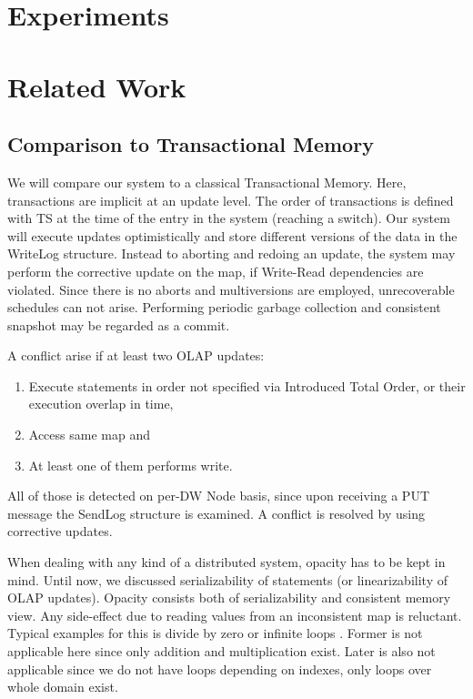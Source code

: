 \documentclass{sig-semester}
\def\OLAP{OLAP\xspace}
\begin{document}
\section{Experiments}
\label{sec:Experiments}
\vspace{2mm}

\section{Related Work}
\label{sec:Related}
\vspace{2mm}

\subsection{Comparison to Transactional Memory}
We will compare our system to a classical Transactional Memory. Here, transactions are implicit at an update level. The order of transactions is defined with TS at the time of the entry in the system (reaching a switch). Our system will execute updates optimistically and store different versions of the data in the WriteLog structure. Instead to aborting and redoing an update, the system may perform the corrective update on the map, if Write-Read dependencies are violated. Since there is no aborts and multiversions are employed, unrecoverable schedules can not arise. Performing periodic garbage collection and consistent snapshot may be regarded as a commit.

A conflict arise if at least two \OLAP updates:
\begin{enumerate}[(1)]
 \item Execute statements in order not specified via Introduced Total Order, or their execution overlap in time, 
 \item Access same map and
 \item At least one of them performs write.
\end{enumerate}

All of those is detected on per-DW Node basis, since upon receiving a PUT message the SendLog structure is examined. A conflict is resolved by using corrective updates.

When dealing with any kind of a distributed system, opacity has to be kept in mind. Until now, we discussed serializability of statements (or linearizability of \OLAP updates). Opacity consists both of serializability and consistent memory view. Any side-effect due to reading values from an inconsistent map is reluctant. Typical examples for this is divide by zero or infinite loops \cite{Rachid08}. Former is not applicable here since only addition and multiplication exist. Later is also not applicable since we do not have loops depending on indexes, only loops over whole domain exist.
\end{document}
